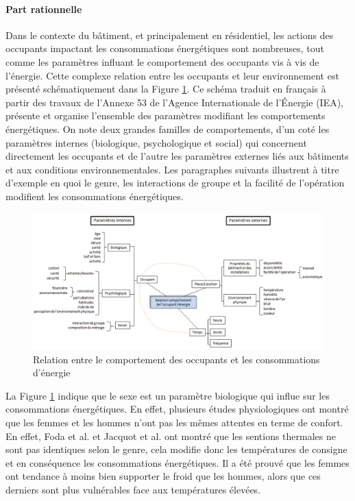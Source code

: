 \paragraph{Part rationnelle}

Dans le contexte du bâtiment, et principalement en résidentiel, les actions des occupants impactant les consommations énergétiques sont nombreuses, tout comme les paramètres influant le comportement des occupants vis à vis de l'énergie. Cette complexe relation entre les occupants et leur environnement est présenté schématiquement dans la Figure \ref{fig:Comportement_occupant_energie}. Ce schéma traduit en français à partir des travaux de l'Annexe 53 \cite{Annex-53-1} de l'Agence Internationale de l'Énergie (IEA), présente et organise l'ensemble des paramètres modifiant les comportements énergétiques. On note deux grandes familles de comportements, d'un coté les paramètres internes (biologique, psychologique et social) qui concernent directement les occupants et de l'autre les paramètres externes liés aux bâtiments et aux conditions environnementales. Les paragraphes suivants illustrent à titre d'exemple en quoi le genre, les interactions de groupe et la facilité de l'opération modifient les consommations énergétiques.

\begin{figure}[H]
\centering
\includegraphics[scale=0.56]{Images/Comportement_occupant_energie}
\caption{Relation entre le comportement des occupants et les consommations d'énergie}
\label{fig:Comportement_occupant_energie}
\end{figure}


La Figure \ref{fig:Comportement_occupant_energie} indique que le sexe est un paramètre biologique qui influe sur les consommations énergétiques. En effet, plusieurs études physiologiques ont montré que les femmes et les hommes n'ont pas les mêmes attentes en terme de confort. En effet, Foda et al. \cite{Foda-11} et Jacquot et al. \cite{Jacquot-14} ont montré que les sentions thermales ne sont pas identiques selon le genre, cela modifie donc les températures de consigne et en conséquence les consommations énergétiques. Il a été prouvé que les femmes ont tendance à moins bien supporter le froid que les hommes, alors que ces derniers sont plus vulnérables face aux températures élevées.


